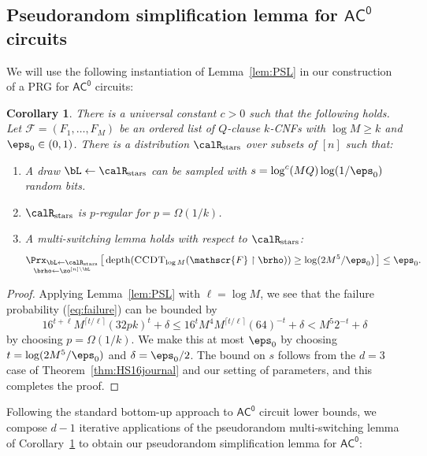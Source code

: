 \documentclass[11pt]{article}
\numberwithin{equation}{section}
\newtheorem{corollary}[theorem]{Corollary}
\theoremstyle{definition}
\theoremstyle{plain}
\theoremstyle{plain}
\newcommand{\acz}{\mathsf{AC^0}}
\newcommand{\uhr}{\upharpoonright}
\newcommand{\CCDT}{\textsc{CCDT}}
\newcommand{\depth}{\mathrm{depth}}
\newcommand{\stars}{\mathrm{stars}}
\begin{document}
\subsection{Pseudorandom simplification lemma for $\acz$ circuits} 

We will use the following instantiation of Lemma~\ref{lem:PSL} in our construction of a PRG for $\acz$ circuits: 

\begin{corollary}
\label{cor:multi-for-ac0} 
There is a universal constant $c > 0$ such that the following holds. Let $\mathscr{F} = (F_1,\ldots,F_M)$ be an ordered list of $Q$-clause $k$-CNFs with $\log M \geq k$ and $\eps_0 \in (0,1)$. There is a distribution $\calR_\stars$ over subsets of $[n]$ such that: 
\begin{enumerate}
\item A draw $\bL \leftarrow\calR_\stars$ can be sampled with $s = \log^c(MQ)\log(1/\eps_0)$ random bits. 
\item $\calR_\stars$ is $p$-regular for $p = \Omega(1/k)$.
\item A multi-switching lemma holds with respect to $\calR_\stars$: 
\[ \mathop{\Prx_{\bL\leftarrow\calR_\stars}}_{\brho\leftarrow\zo^{[n]\setminus \bL}}\big[\,\depth(\CCDT_{\log M}(\mathscr{F}\uhr\brho)) \ge \log(2M^{5}/\eps_0)\,\big] \le \eps_0. \]
\end{enumerate}  
\end{corollary} 



\begin{proof}
Applying Lemma~\ref{lem:PSL} with $\ell = \log M$, we see that the failure probability (\ref{eq:failure}) can be bounded by 
\[ 
16^{t+\ell}M^{\lceil t/\ell\rceil} (32pk)^t + \delta \le 16^{t}M^4 
M^{\lceil t/\ell\rceil} 
(64)^{-t} + \delta < M^5 2^{-t} + \delta
\]
by choosing $p = \Omega(1/k)$.  We make this at most $\eps_0$ by choosing $t = \log(2M^{5}/\eps_0)$ and $\delta = \eps_0/2$. The bound on $s$ follows from the $d=3$ case of Theorem~\ref{thm:HS16journal} and our setting of parameters, and this completes the proof. 
\end{proof} 

Following the standard bottom-up approach to $\acz$ circuit lower bounds, we compose $d-1$ iterative applications of the pseudorandom multi-switching lemma of Corollary~\ref{cor:multi-for-ac0} to obtain our pseudorandom simplification lemma for $\acz$:
\end{document}
